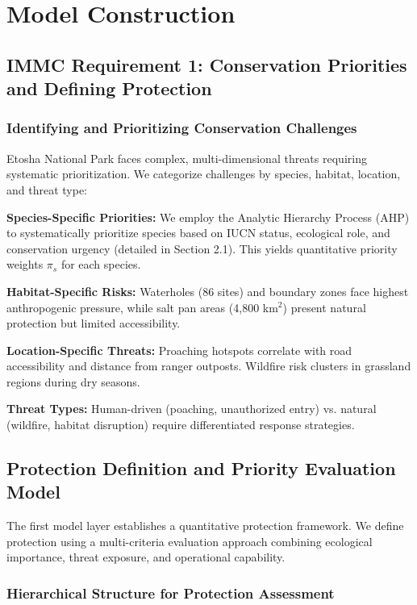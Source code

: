 \section{Model Construction}

\subsection*{IMMC Requirement 1: Conservation Priorities and Defining Protection}

\subsubsection{Identifying and Prioritizing Conservation Challenges}

Etosha National Park faces complex, multi-dimensional threats requiring systematic prioritization. We categorize challenges by species, habitat, location, and threat type:

\textbf{Species-Specific Priorities:} We employ the Analytic Hierarchy Process (AHP) to systematically prioritize species based on IUCN status, ecological role, and conservation urgency (detailed in Section 2.1). This yields quantitative priority weights $\pi_s$ for each species.

\textbf{Habitat-Specific Risks:} Waterholes (86 sites) and boundary zones face highest anthropogenic pressure, while salt pan areas (4,800 km$^2$) present natural protection but limited accessibility.

\textbf{Location-Specific Threats:} Proaching hotspots correlate with road accessibility and distance from ranger outposts. Wildfire risk clusters in grassland regions during dry seasons.

\textbf{Threat Types:} Human-driven (poaching, unauthorized entry) vs. natural (wildfire, habitat disruption) require differentiated response strategies.

\subsection{Protection Definition and Priority Evaluation Model}

The first model layer establishes a quantitative protection framework. We define protection using a multi-criteria evaluation approach combining ecological importance, threat exposure, and operational capability.

\subsubsection{Hierarchical Structure for Protection Assessment}

